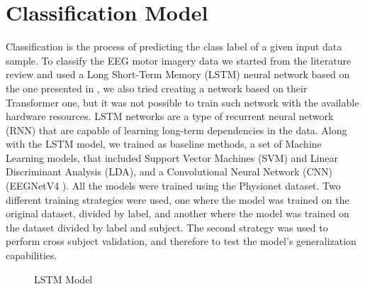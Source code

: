 \section{Classification Model}
Classification is the process of predicting the class label of a given input data sample.
To classify the EEG motor imagery data we started from the literature review and used a Long Short-Term Memory (LSTM) neural network based on the one presented in \cite{sharma_deep_2023}, we also tried creating a network based on their Transformer one, but it was not possible to train such network with the available hardware resources.
LSTM networks are a type of recurrent neural network (RNN) that are capable of learning long-term dependencies in the data.
Along with the LSTM model, we trained as baseline methods, a set of Machine Learning models, that included Support Vector Machines (SVM) and Linear Discriminant Analysis (LDA), and a Convolutional Neural Network (CNN) (EEGNetV4 \cite{lawhern2018eegnet}).
All the models were trained using the Physionet dataset. 
Two different training strategies were used, one where the model was trained on the original dataset, divided by label, and another where the model was trained on the dataset divided by label and subject.
The second strategy was used to perform cross subject validation, and therefore to test the model's generalization capabilities.
\begin{figure}[!htbp]
    \centering
    \caption{LSTM Model}
    \label{fig:lstm}
\end{figure}

